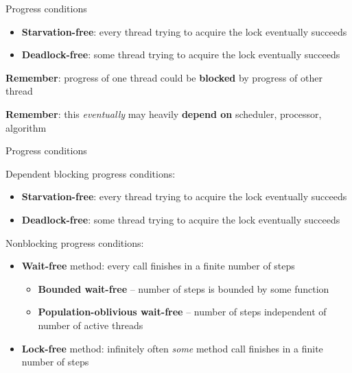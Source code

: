 

\begin{frame}[t,noframenumbering]{Progress conditions}

\begin{itemize}
  \item \textbf{Starvation-free}: every thread trying to acquire the lock eventually succeeds
  \item \textbf{Deadlock-free}: some thread trying to acquire the lock eventually succeeds
\end{itemize}

\textbf{Remember}: progress of one thread could be \textbf{blocked} by progress of other thread

\textbf{Remember}: this \textit{eventually} may heavily \textbf{depend on} scheduler, processor, algorithm

\end{frame}

\begin{frame}[t,noframenumbering]{Progress conditions}

Dependent blocking progress conditions:
\begin{itemize}
  \item \textbf{Starvation-free}: every thread trying to acquire the lock eventually succeeds
  \item \textbf{Deadlock-free}: some thread trying to acquire the lock eventually succeeds
\end{itemize}

\pause
Nonblocking progress conditions:
\begin{itemize}
  \pause \item \textbf{Wait-free} method: every call finishes in a finite number of steps
  \begin{itemize}
    \pause \item \textbf{Bounded wait-free} -- number of steps is bounded by some function
    \pause \item \textbf{Population-oblivious wait-free} -- number of steps independent of number of active threads
  \end{itemize}

  \pause \item \textbf{Lock-free} method: infinitely often \textit{some} method call finishes in a finite number of steps
\end{itemize}
\end{frame}

